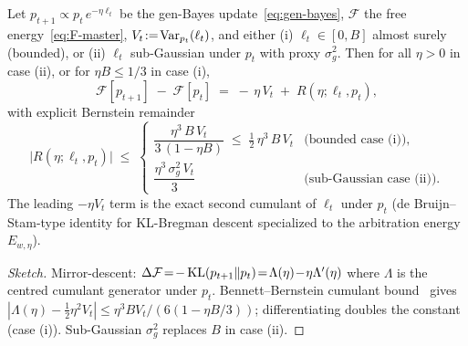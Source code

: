 \begin{lemma}
\label{lem:lyapunov-dissipation}
Let $p_{t+1}\!\propto\!p_t\,e^{-\eta\ell_t}$ be the gen-Bayes
update~\eqref{eq:gen-bayes}, $\mathcal{F}$ the free
energy~\eqref{eq:F-master}, $V_t\!:=\!\operatorname{Var}_{p_t}(\ell_t)$, and
either (i) $\ell_t\!\in\![0,B]$ almost surely (bounded), or
(ii) $\ell_t$ sub-Gaussian under $p_t$ with proxy $\sigma^2_g$.
Then for all $\eta\!>\!0$ in case (ii), or for $\eta B\!\le\!1/3$
in case (i),
\begin{equation}
\mathcal{F}[p_{t+1}]\;-\;\mathcal{F}[p_t]
\;=\;-\,\eta\,V_t\;+\;R(\eta;\ell_t,p_t),
\label{eq:lyapunov-dissipation}
\end{equation}
with explicit Bernstein remainder
\begin{equation}
\bigl|R(\eta;\ell_t,p_t)\bigr|
\;\le\;
\begin{cases}
\dfrac{\eta^{3}\,B\,V_t}{3\,(1-\eta B)} \;\le\; \tfrac{1}{2}\,\eta^{3}\,B\,V_t & \text{(bounded case (i))},\\[6pt]
\dfrac{\eta^{3}\,\sigma^{2}_g\,V_t}{3} & \text{(sub-Gaussian case (ii))}.
\end{cases}
\label{eq:lyapunov-bernstein}
\end{equation}
The leading $-\eta V_t$ term is the exact second cumulant of $\ell_t$
under $p_t$ (de Bruijn--Stam-type identity for KL-Bregman descent
\citep{cover2006elements,beck2003mirror} specialized to the
arbitration energy $E_{w,\eta}$).
\end{lemma}

\begin{proof}[Sketch]
Mirror-descent: $\Delta\mathcal{F}\!=\!-\operatorname{KL}(p_{t+1}\|p_t)\!=\!\Lambda(\eta)\!-\!\eta\Lambda'(\eta)$
where $\Lambda$ is the centred cumulant generator under $p_t$.
Bennett--Bernstein cumulant bound~\citep[Lemma 2.4]{boucheron2013concentration}
gives $|\Lambda(\eta)\!-\!\tfrac12\eta^2 V_t|\!\le\!\eta^3 BV_t/(6(1\!-\!\eta B/3))$;
differentiating doubles the constant (case (i)).  Sub-Gaussian
$\sigma_g^2$ replaces $B$ in case (ii).
\end{proof}


